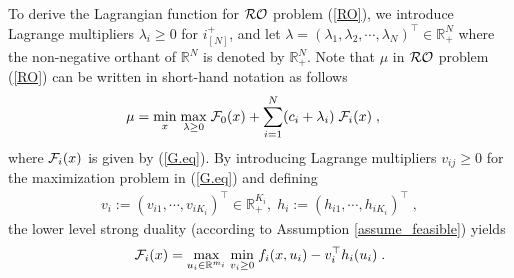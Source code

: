 \documentclass[journal,twoside,web]{ieeecolor}
\begin{document}
To derive the Lagrangian function for ${\cal RO}$ problem (\ref{RO}), we introduce Lagrange multipliers $\lambda_i\geq 0$ for $i^+_{[N]}$, and let $\lambda=(\lambda_1,\lambda_2,\cdots,\lambda_N)^\top \in \mathbb{R}_+^N$ where the non-negative orthant of $\mathbb{R}^N$ is denoted by $\mathbb{R}_+^N$. Note that $\mu$ in ${\cal RO}$ problem (\ref{RO}) can be written in short-hand notation  as follows
\begin{align}
\mu=&\;\underset{x}{\min}\;\underset{\lambda\geq 0}{\max}\; {\cal F}_0(x)+\sum_{i=1}^N (c_i+\lambda_i) \; {\cal F}_i(x)\;,
 \label{upper_ro}
\end{align}
where ${\cal F}_i(x)$ is given by (\ref{G.eq}).
 By introducing Lagrange multipliers $v_{ij} \geq 0$ for the maximization problem in (\ref{G.eq}) and defining
\begin{align*}
v_i:=(v_{i1},\cdots, v_{iK_i})^\top \in \mathbb{R}_+^{K_i},\;h_i:=(h_{i1},\cdots, h_{iK_i})^\top\;,\nonumber
\end{align*}
the lower level strong duality (according to Assumption \ref{assume_feasible}) yields
\begin{align} \label{lower_ro}
{\cal F}_i(x)=\underset{u_i\in \mathbb{R}^{m_i}}{\max}\;\underset{v_{i}\geq 0}{\min}\;f_i(x,u_i)-v_i^\top h_{i}(u_i)\;.
\end{align}
\end{document}
